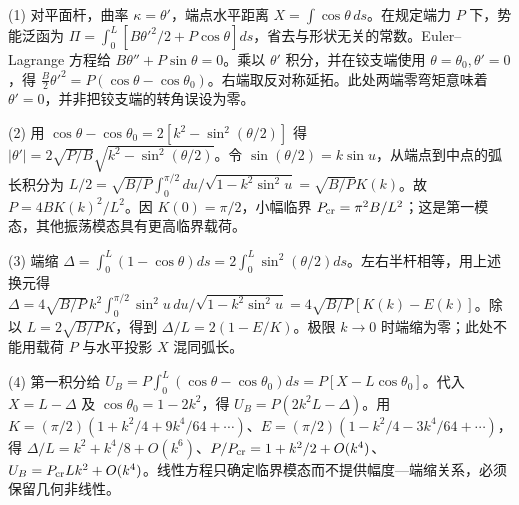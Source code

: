 (1) 对平面杆，曲率 \(\kappa=\theta'\)，端点水平距离 \(X=\int\cos\theta\,ds\)。在规定端力 \(P\) 下，势能泛函为 \(\Pi=\int_0^L [B\theta'^2/2+P\cos\theta]ds\)，省去与形状无关的常数。Euler--Lagrange 方程给 \(B\theta''+P\sin\theta=0\)。乘以 \(\theta'\) 积分，并在铰支端使用 \(\theta=\theta_0,\theta'=0\)，得 \(\frac{B}{2}\theta'^2=P(\cos\theta-\cos\theta_0)\)。右端取反对称延拓。此处两端零弯矩意味着 \(\theta'=0\)，并非把铰支端的转角误设为零。

(2) 用 \(\cos\theta-\cos\theta_0=2[k^2-\sin^2(\theta/2)]\) 得 \(|\theta'|=2\sqrt{P/B}\sqrt{k^2-\sin^2(\theta/2)}\)。令 \(\sin(\theta/2)=k\sin u\)，从端点到中点的弧长积分为 \(L/2=\sqrt{B/P}\int_0^{\pi/2}du/\sqrt{1-k^2\sin^2u}=\sqrt{B/P}K(k)\)。故 \(P=4BK(k)^2/L^2\)。因 \(K(0)=\pi/2\)，小幅临界 \(P_{\rm cr}=\pi^2B/L^2\)；这是第一模态，其他振荡模态具有更高临界载荷。

(3) 端缩 \(\Delta=\int_0^L(1-\cos\theta)ds=2\int_0^L\sin^2(\theta/2)ds\)。左右半杆相等，用上述换元得 \(\Delta=4\sqrt{B/P}\,k^2\int_0^{\pi/2}\sin^2u\,du/\sqrt{1-k^2\sin^2u}=4\sqrt{B/P}[K(k)-E(k)]\)。除以 \(L=2\sqrt{B/P}K\)，得到 \(\boxed{\Delta/L=2(1-E/K)}\)。极限 \(k\to0\) 时端缩为零；此处不能用载荷 \(P\) 与水平投影 \(X\) 混同弧长。

(4) 第一积分给 \(U_B=P\int_0^L(\cos\theta-\cos\theta_0)ds=P[X-L\cos\theta_0]\)。代入 \(X=L-\Delta\) 及 \(\cos\theta_0=1-2k^2\)，得 \(\boxed{U_B=P(2k^2L-\Delta)}\)。用 \(K=(\pi/2)(1+k^2/4+9k^4/64+\cdots)\)、\(E=(\pi/2)(1-k^2/4-3k^4/64+\cdots)\)，得 \(\Delta/L=k^2+k^4/8+O(k^6)\)、\(P/P_{\rm cr}=1+k^2/2+O(k^4)\)、\(U_B=P_{\rm cr}Lk^2+O(k^4)\)。线性方程只确定临界模态而不提供幅度—端缩关系，必须保留几何非线性。
